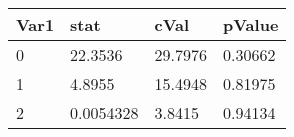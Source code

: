 \begin{tabular}{llll}
\toprule 
Var1 & stat & cVal & pValue \\ 
\midrule 
0 & 22.3536 & 29.7976 & 0.30662 \\ 
1 & 4.8955 & 15.4948 & 0.81975 \\ 
2 & 0.0054328 & 3.8415 & 0.94134 \\ 
\bottomrule 
\end{tabular}